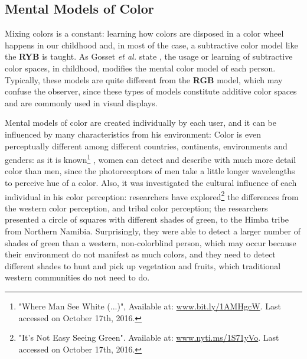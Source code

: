 \subsection{Mental Models of Color}
%
Mixing colors is a constant: learning how colors are disposed in a color wheel happens in our childhood and, in
most of the case, a subtractive color model like the \textbf{RYB} is taught. As Gosset \emph{et al.} state
\cite{Gossett2004}, the usage or learning of subtractive color spaces, in childhood, modifies the mental color
model of each person. Typically, these models are quite different from the \textbf{RGB} model, which may confuse
the observer, since these types of models constitute additive color spaces and are commonly used in visual
displays. \par
%
Mental models of color are created individually by each user, and it can be influenced by many characteristics
from his environment: Color is even perceptually different among different countries, continents, environments
and genders: as it is known\footnote{"Where Man See White (...)", Available at: \url{www.bit.ly/1AMHgcW}. Last
accessed on October 17th, 2016.} \cite{Ginter2011}, women can detect and describe with much more detail color
than men, since the photoreceptors of men take a little longer wavelengths to perceive hue of a color. Also, it
was investigated the cultural influence of each individual in his color perception: researchers have
explored\footnote{\label{itsnoteasy}"It's Not Easy Seeing Green". Available at: \url{www.nyti.ms/1S71yVo}. Last
accessed on October 17th, 2016.} the differences from the western color perception, and tribal color perception;
the researchers presented a circle of squares with different shades of green, to the Himba tribe from Northern Namibia.
Surprisingly, they were able to detect a larger number of shades of green than a western, non-colorblind person,
which may occur because their environment do not manifest as much colors, and they need to detect different shades
to hunt and pick up vegetation and fruits, which traditional western communities do not need to do. \par
%
